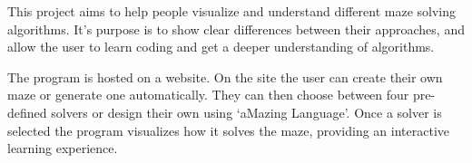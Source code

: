 This project aims to help people visualize and understand different maze solving algorithms. It’s purpose is to show clear differences between their approaches, and allow the user to learn coding and get a deeper understanding of algorithms.

The program is hosted on a website. On the site the user can create their own maze or generate one automatically. They can then choose between four pre-defined solvers or design their own using ‘aMazing Language’. Once a solver is selected the program visualizes how it solves the maze, providing an interactive learning experience.
